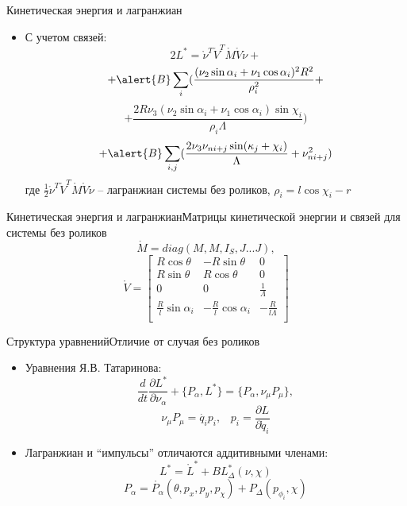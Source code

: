 \documentclass{beamer}
\begin{document}
\begin{frame}{Кинетическая энергия и лагранжиан}
  \begin{itemize}
  \item {
    С учетом связей:
    $$ 2L^{*} = \mathring{\nu}^T \mathring{V}^T \mathring{M} \mathring{V} \mathring{\nu} + $$
    $$ + \alert{B}\sum_{i}(
    	\frac{(\nu_2\sin\alpha_i+\nu_1\cos\alpha_i)^2R^2}
    	{\rho_i^2} + $$
    $$ +
    	\frac{2R\nu_3(\nu_2\sin\alpha_i+\nu_1\cos\alpha_i)\sin\chi_i}
    	{\rho_i\Lambda}
    ) $$
    $$ +
    \alert{B}\sum_{i,j}(
    	\frac{2\nu_3\nu_{ni+j}\sin(\kappa_j+\chi_i)}
    	{\Lambda}
    	+
    	\nu_{ni+j}^2
    )
    $$
    где $ \frac{1}{2}\mathring{\nu}^T \mathring{V}^T \mathring{M} \mathring{V} \mathring{\nu} $ -- лагранжиан системы без роликов, $\rho_i = l\cos\chi_i - r$
  }

  \end{itemize}
\end{frame}

\begin{frame}{Кинетическая энергия и лагранжиан}{Матрицы кинетической энергии и связей для системы без роликов}
    $$ \mathring{M} = diag(M, M, I_S, J...J), $$
    $$ \mathring{V} = \begin{bmatrix}
        R\cos\theta & -R\sin\theta & 0 \\
        R\sin\theta & R\cos\theta  & 0 \\
        0           & 0            & \frac{1}{\Lambda} \\
        \frac{R}{l}\sin\alpha_i & -\frac{R}{l}\cos\alpha_i & -\frac{R}{l\Lambda} \\
    \end{bmatrix} $$
\end{frame}


\begin{frame}{Структура уравнений}{Отличие от случая без роликов}
  \begin{itemize}
  \item {
    Уравнения Я.В. Татаринова:
    \begin{equation}\label{Tatarinov}
    \frac{d}{dt}\frac{\partial L^{*}}{\partial \nu_\alpha}  + \{P_\alpha, L^{*}\} = \{P_\alpha, \nu_\mu P_\mu\},
    \end{equation}
    $$ \nu_\mu P_\mu = \dot{q_i} p_i, \hspace{10pt} p_i = \frac{\partial L}{\partial \dot{q}_i} $$
  }
  \item {
    Лагранжиан и ``импульсы'' отличаются аддитивными членами:
    $$ L^{*} = \mathring{L}^{*} + BL^{*}_\Delta(\nu, \chi) $$
    $$ P_\alpha = \mathring{P_\alpha}(\theta, p_x, p_y, p_\chi) + P_\Delta(p_{\phi_i}, \chi) $$
  }

  \end{itemize}
\end{frame}
\end{document}
